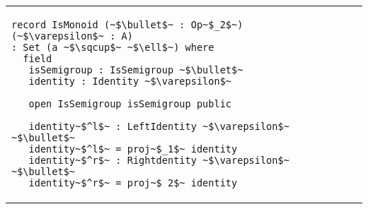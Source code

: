 \begin{adjustbox}{width=1.2\columnwidth,center}
\begin{tabular}{p{7cm} p{7cm} p{7cm}}
\begin{verbatim}
record IsMonoid (~$\bullet$~ : Op~$_2$~) (~$\varepsilon$~ : A) 
: Set (a ~$\sqcup$~ ~$\ell$~) where 
  field 
   isSemigroup : IsSemigroup ~$\bullet$~ 
   identity : Identity ~$\varepsilon$~ 
       
   open IsSemigroup isSemigroup public 
   
   identity~$^l$~ : LeftIdentity ~$\varepsilon$~ ~$\bullet$~ 
   identity~$^l$~ = proj~$_1$~ identity 
   identity~$^r$~ : Rightdentity ~$\varepsilon$~ ~$\bullet$~ 
   identity~$^r$~ = proj~$_2$~ identity        
\end{verbatim}       
\end{tabular}  
\end{adjustbox}
